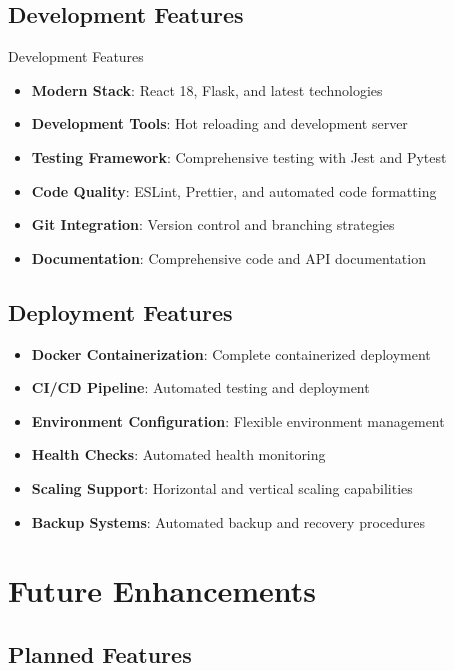 \documentclass[11pt,a4paper]{article}
\begin{document}
\subsection{Development Features}

\begin{techbox}{\faCode\space Development Features}
\begin{itemize}
    \item \textbf{Modern Stack}: React 18, Flask, and latest technologies
    \item \textbf{Development Tools}: Hot reloading and development server
    \item \textbf{Testing Framework}: Comprehensive testing with Jest and Pytest
    \item \textbf{Code Quality}: ESLint, Prettier, and automated code formatting
    \item \textbf{Git Integration}: Version control and branching strategies
    \item \textbf{Documentation}: Comprehensive code and API documentation
\end{itemize}
\end{techbox}

\subsection{Deployment Features}

\begin{itemize}
    \item \textbf{Docker Containerization}: Complete containerized deployment
    \item \textbf{CI/CD Pipeline}: Automated testing and deployment
    \item \textbf{Environment Configuration}: Flexible environment management
    \item \textbf{Health Checks}: Automated health monitoring
    \item \textbf{Scaling Support}: Horizontal and vertical scaling capabilities
    \item \textbf{Backup Systems}: Automated backup and recovery procedures
\end{itemize}

\section{Future Enhancements}

\subsection{Planned Features}
\end{document}
